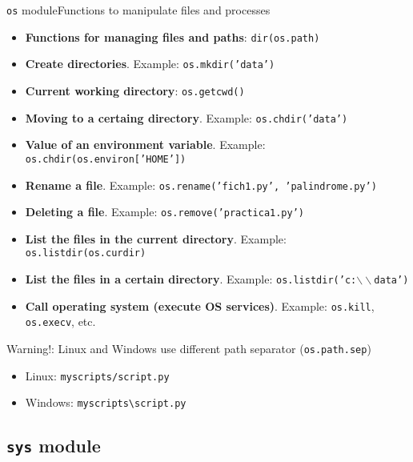 \documentclass[10pt,compress]{beamer} %
\begin{document}
\begin{frame}{\texttt{os} module}{Functions to manipulate files and processes}
\vspace{-0.2cm}
\footnotesize{
\begin{block}{}
\vspace{-0.15cm}

\begin{itemize}			
\item \textbf{Functions for managing files and paths}: \texttt{dir(os.path)}
\item \textbf{Create directories}. Example: \texttt{os.mkdir('data')}
\item \textbf{Current working directory}: \texttt{os.getcwd()}
\item \textbf{Moving to a certaing directory}. Example: \texttt{os.chdir('data')}
\item \textbf{Value of an environment variable}. Example: \texttt{os.chdir(os.environ['HOME'])}
\item \textbf{Rename a file}. Example: \texttt{os.rename('fich1.py', 'palindrome.py')}
\item \textbf{Deleting a file}. Example: \texttt{os.remove('practica1.py')}
\item \textbf{List the files in the current directory}. Example: \texttt{os.listdir(os.curdir)}
\item \textbf{List the files in a certain directory}. Example: \texttt{os.listdir('c:$\backslash\backslash$data')}
\item \textbf{Call operating system (execute OS services)}. Example: \texttt{os.kill}, \texttt{os.execv}, etc.
\vspace{-0.1cm}
\end{itemize}

\end{block}	
}

Warning!: Linux and Windows use different path separator (\texttt{os.path.sep})
    \begin{itemize}
        \item Linux: \texttt{myscripts/script.py}
        \item Windows: \texttt{myscripts\textbackslash script.py}
    \end{itemize}

\end{frame}

\subsection{\texttt{sys} module}
\end{document}
